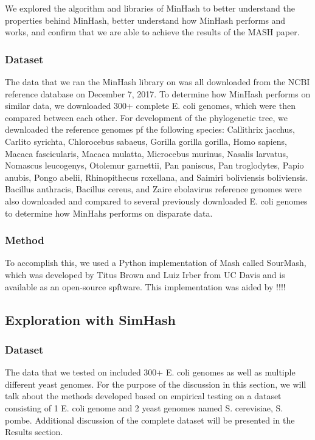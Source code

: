 \documentclass[12pt, letterpaper]{article}
\begin{document}
We explored the algorithm and libraries of MinHash to better understand the properties behind MinHash, better understand how MinHash performs and works, and confirm that we are able to achieve the results of the MASH paper.

\subsubsection{Dataset}
The data that we ran the MinHash library on was all downloaded from the NCBI reference database on December 7, 2017. To determine how MinHash performs on similar data, we downloaded 300+ complete E. coli genomes, which were then compared between each other. For development of the phylogenetic tree, we dewnloaded the reference genomes pf the following species: Callithrix jacchus, Carlito syrichta, Chlorocebus sabaeus, Gorilla gorilla gorilla, Homo sapiens, Macaca fascicularis, Macaca mulatta, Microcebus murinus, Nasalis larvatus, Nomascus leucogenys, Otolemur garnettii, Pan paniscus, Pan troglodytes, Papio anubis, Pongo abelii, Rhinopithecus roxellana, and Saimiri boliviensis boliviensis. Bacillus anthracis, Bacillus cereus, and Zaire ebolavirus reference genomes were also downloaded and compared to several previously downloaded E. coli genomes to determine how MinHahs performs on disparate data.

\subsubsection{Method}
To accomplish this, we used a Python implementation of Mash called SourMash, which was developed by Titus Brown and Luiz Irber from UC Davis and is available as an open-source spftware.\cite{GitHub-Sourmash} This implementation was aided by !!!!

\subsection{Exploration with SimHash}
\subsubsection{Dataset}
The data that we tested on included 300+ E. coli genomes as well as multiple different yeast genomes. For the purpose of the discussion in this section, we will talk about the methods developed based on empirical testing on a dataset consisting of 1 E. coli genome and 2 yeast genomes named S. cerevisiae, S. pombe. Additional discussion of the complete dataset will be presented in the Results section.
\end{document}
